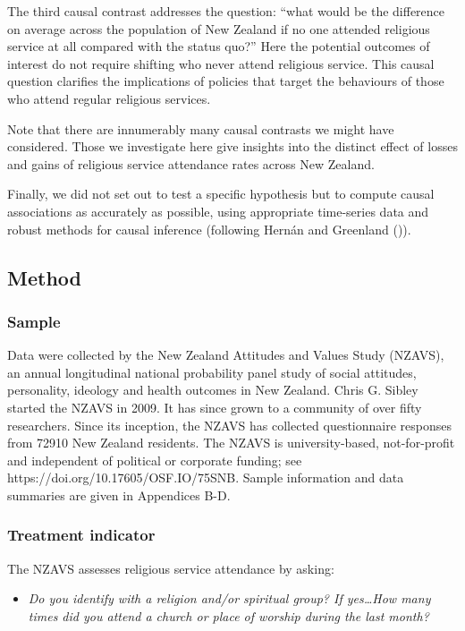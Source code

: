 \documentclass[
  single column]{article}
\providecommand{\tightlist}{%
  \setlength{\itemsep}{0pt}\setlength{\parskip}{0pt}}\usepackage{longtable,booktabs,array}
\begin{document}
The third causal contrast addresses the question: ``what would be the
difference on average across the population of New Zealand if no one
attended religious service at all compared with the status quo?'' Here
the potential outcomes of interest do not require shifting who never
attend religious service. This causal question clarifies the
implications of policies that target the behaviours of those who attend
regular religious services.

Note that there are innumerably many causal contrasts we might have
considered. Those we investigate here give insights into the distinct
effect of losses and gains of religious service attendance rates across
New Zealand.

Finally, we did not set out to test a specific hypothesis but to compute
causal associations as accurately as possible, using appropriate
time-series data and robust methods for causal inference (following
Hernán and Greenland ()).

\subsection{Method}\label{method}

\subsubsection{Sample}\label{sample}

Data were collected by the New Zealand Attitudes and Values Study
(NZAVS), an annual longitudinal national probability panel study of
social attitudes, personality, ideology and health outcomes in New
Zealand. Chris G. Sibley started the NZAVS in 2009. It has since grown
to a community of over fifty researchers. Since its inception, the NZAVS
has collected questionnaire responses from 72910 New Zealand residents.
The NZAVS is university-based, not-for-profit and independent of
political or corporate funding; see
https://doi.org/10.17605/OSF.IO/75SNB. Sample information and data
summaries are given in Appendices B-D.

\subsubsection{Treatment indicator}\label{treatment-indicator}

The NZAVS assesses religious service attendance by asking:

\begin{itemize}
\tightlist
\item
  \emph{Do you identify with a religion and/or spiritual group? If
  yes\ldots How many times did you attend a church or place of worship
  during the last month?}
\end{itemize}
\end{document}
